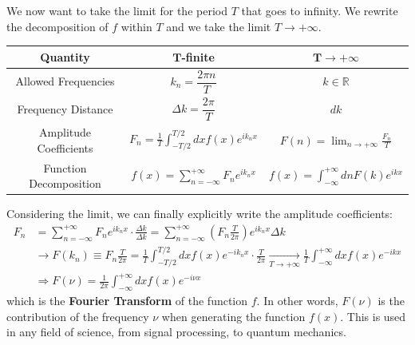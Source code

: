 \documentclass[12pt,a4paper]{article}
\begin{document}
We now want to take the limit for the period $T$ that goes to infinity. We rewrite the decomposition of $f$ within $T$ and we take the limit $T\to +\infty$.
\begin{table}[h]
	\centering
	\renewcommand{\arraystretch}{2} %
	\begin{tabular}{|c|c|c|}
		\hline
		\textbf{Quantity} & $\mathbf{T}$-finite & $\mathbf{T \to +\infty}$ \\
		\hline
		Allowed Frequencies & $k_n=\dfrac{2\pi n}{T}$ & $k\in\mathbb{R}$ \\
		\hline
		Frequency Distance & $\Delta k=\dfrac{2\pi}{T}$ & $dk$ \\
		\hline
		Amplitude Coefficients & $F_n=\frac{1}{T} \int_{-T/2}^{T/2} dx f(x) e^{ik_nx}$ & $F(n)=\displaystyle{\lim_{n \to +\infty}} \frac{F_n}{T}  $ \\
		\hline
		Function Decomposition & $f(x) = \sum_{n=-\infty}^{+\infty} F_n e^{ik_nx}$ & $f(x) = \int_{-\infty}^{+\infty} dn F(k) e^{ikx}$ \\
		\hline
	\end{tabular}
\end{table}
Considering the limit, we can finally explicitly write the amplitude coefficients:
\begin{align*}
	F_n&=\sum_{n=-\infty}^{+\infty} F_n e^{ik_nx} \cdot \frac{\Delta k}{\Delta k} = \sum_{n=-\infty}^{+\infty} (F_n \frac{T}{2\pi}) e^{ik_nx} \Delta k \\[5pt]
	&\rightarrow F(k_n) \equiv F_n \frac{T}{2\pi} = \frac{1}{T} \int_{-T/2}^{T/2} dx f(x) e^{-ik_nx} \cdot \frac{T}{2\pi} \xrightarrow[T\to +\infty]{} \frac{1}{T}\int_{-\infty}^{+\infty} dx f(x) e^{-ikx} \\[5pt]
	&\Rightarrow F(\nu) = \frac{1}{2\pi} \int_{-\infty}^{+\infty} dx f(x) e^{-i\nu x}
\end{align*}
which is the \textbf{Fourier Transform} of the function $f$. In other words, $F(\nu)$ is the contribution of the frequency $\nu$ when generating the function $f(x)$. This is used in any field of science, from signal processing, to quantum mechanics.
\end{document}
